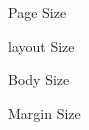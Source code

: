 \documentclass[ aspectratio=149,  14pt,blue,xcolor=pdftex,dvipsnames,table,handout,notes]{beamer}
\begin{document}
\begin{frame}[t]
			\begin{block} {Page Size}
			\end{block}

			\begin{block} {layout Size}
			\end{block}

			\begin{block} {Body Size}
			\end{block}

			\begin{block} {Margin Size}
			\end{block}

		\end{frame}


\end{document}
